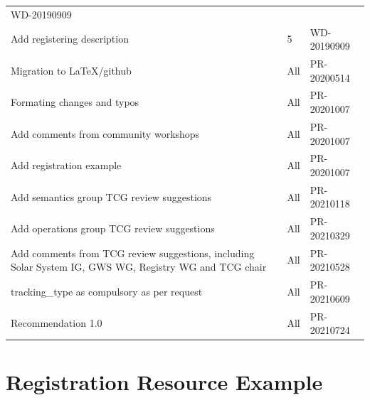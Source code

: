 \documentclass[11pt,a4paper]{ivoa}
\begin{document}
\begin{table}[H]
\begin{tabular}{p{3.75in}p{0.92in}p{0.8in}}
\multicolumn{1}{|p{0.9in}|}{{\fontsize{10pt}{12.0pt}\selectfont WD-20190909}} \\
\multicolumn{1}{|p{3.75in}}{Add registering description} &
\multicolumn{1}{|p{0.72in}}{5} &
\multicolumn{1}{|p{0.9in}|}{{\fontsize{10pt}{12.0pt}\selectfont WD-20190909}} \\
\multicolumn{1}{|p{3.75in}}{Migration to LaTeX/github} &
\multicolumn{1}{|p{0.72in}}{All} &
\multicolumn{1}{|p{0.9in}|}{{\fontsize{10pt}{12.0pt}\selectfont PR-20200514}} \\
\multicolumn{1}{|p{3.75in}}{Formating changes and typos} &
\multicolumn{1}{|p{0.72in}}{All} &
\multicolumn{1}{|p{0.9in}|}{{\fontsize{10pt}{12.0pt}\selectfont PR-20201007}} \\
\multicolumn{1}{|p{3.75in}}{Add comments from community workshops} &
\multicolumn{1}{|p{0.72in}}{All} &
\multicolumn{1}{|p{0.9in}|}{{\fontsize{10pt}{12.0pt}\selectfont PR-20201007}} \\
\multicolumn{1}{|p{3.75in}}{Add registration example} &
\multicolumn{1}{|p{0.72in}}{All} &
\multicolumn{1}{|p{0.9in}|}{{\fontsize{10pt}{12.0pt}\selectfont PR-20201007}} \\
\multicolumn{1}{|p{3.75in}}{Add semantics group TCG review suggestions} &
\multicolumn{1}{|p{0.72in}}{All} &
\multicolumn{1}{|p{0.9in}|}{{\fontsize{10pt}{12.0pt}\selectfont PR-20210118}} \\
\multicolumn{1}{|p{3.75in}}{Add operations group TCG review suggestions} &
\multicolumn{1}{|p{0.72in}}{All} &
\multicolumn{1}{|p{0.9in}|}{{\fontsize{10pt}{12.0pt}\selectfont PR-20210329}} \\
\multicolumn{1}{|p{3.75in}}{Add comments from TCG review suggestions, including
Solar System IG, GWS WG, Registry WG and TCG chair} &
\multicolumn{1}{|p{0.72in}}{All} &
\multicolumn{1}{|p{0.9in}|}{{\fontsize{10pt}{12.0pt}\selectfont PR-20210528}} \\
\multicolumn{1}{|p{3.75in}}{tracking\_type as compulsory as per request} &
\multicolumn{1}{|p{0.72in}}{All} &
\multicolumn{1}{|p{0.9in}|}{{\fontsize{10pt}{12.0pt}\selectfont PR-20210609}} \\
\multicolumn{1}{|p{3.75in}}{Recommendation 1.0} &
\multicolumn{1}{|p{0.72in}}{All} &
\multicolumn{1}{|p{0.9in}|}{{\fontsize{10pt}{12.0pt}\selectfont PR-20210724}} \\

\hline
\end{tabular}
 \end{table}

\pagebreak


\section{Registration Resource Example}



\end{document}
